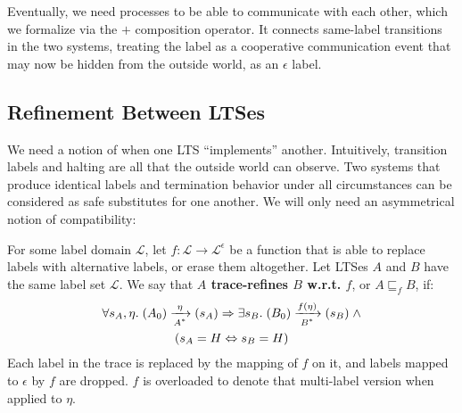 Eventually, we need processes to be able to communicate with each
other, which we formalize via the $+$ composition operator. It
connects same-label transitions in the two systems, treating the label
as a cooperative communication event that may now be hidden from the
outside world, as an $\epsilon$ label.


\subsection{Refinement Between LTSes}

We need a notion of when one LTS ``implements'' another.  Intuitively,
transition labels and halting are all that the outside world
can observe. Two systems that produce identical labels and termination behavior
under all circumstances can be considered as safe substitutes for
one another. We will only need an asymmetrical notion of compatibility:

\begin{defn}\label{refines}
For some label domain $\mathcal L$, let $f : \mathcal L \to \mathcal L^\epsilon$ 
be a function that is able to replace labels with alternative
labels, or erase them altogether. Let LTSes $A$ and $B$ have the same label
set $\mathcal L$. We say that
\textbf{$A$ trace-refines $B$ w.r.t. $f$}, or $A \sqsubseteq_f B$, if:
\begin{multline*}
\forall s_A, \eta. \; \io{$A^{*}$}{A_0}{s_A}{\eta} \Rightarrow \exists s_B. \;
\io{$B^{*}$}{B_0}{s_B}{f(\eta)} \; \wedge \\
(s_A = H \Leftrightarrow s_B = H)
\end{multline*}
Each label in the trace is replaced by the mapping of $f$ on it, and
labels mapped to $\epsilon$ by $f$ are dropped. $f$ is overloaded
to denote that multi-label version when applied to $\eta$.
\end{defn}

